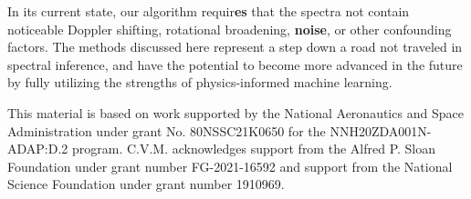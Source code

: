 \documentclass[twocolumn, linenumbers]{aastex631}
\begin{document}
In its current state, our algorithm requir\textbf{es} that the spectra not contain noticeable Doppler shifting, rotational broadening, \textbf{noise}, or other confounding factors.
The methods discussed here represent a step down a road not traveled in spectral inference, and have the potential to become more advanced in the future by fully utilizing the strengths of physics-informed machine learning.

\vspace{0.5cm}
This material is based on work supported by the National Aeronautics and Space Administration under grant No. 80NSSC21K0650 for the NNH20ZDA001N-ADAP:D.2 program. C.V.M. acknowledges support from the Alfred P. Sloan Foundation under grant number FG-2021-16592 and support from the National Science Foundation under grant number 1910969.
\vspace{0.5cm}



\end{document}
